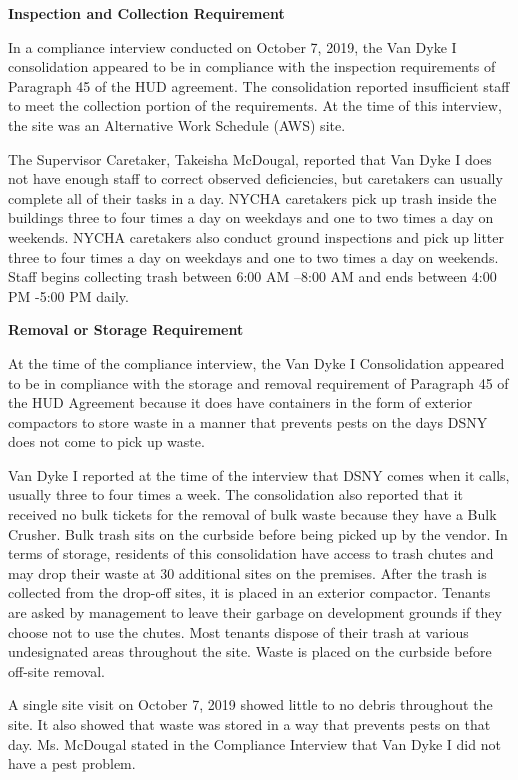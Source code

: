 
\textbf{Inspection and Collection Requirement}

In a compliance interview conducted on October 7, 2019, the Van Dyke I consolidation appeared to be in compliance with the inspection requirements of Paragraph 45 of the HUD agreement. The consolidation reported insufficient staff to meet the collection portion of the requirements. At the time of this interview, the site was an Alternative Work Schedule (AWS) site. 

The Supervisor Caretaker, Takeisha McDougal, reported that Van Dyke I does not have enough staff to correct observed deficiencies, but caretakers can usually complete all of their tasks in a day. NYCHA caretakers pick up trash inside the buildings three to four times a day on weekdays and one to two times a day on weekends. NYCHA caretakers also conduct ground inspections and pick up litter three to four times a day on weekdays and one to two times a day on weekends. Staff begins collecting trash between 6:00 AM --8:00 AM and ends between 4:00 PM -5:00 PM daily. 

\textbf{Removal or Storage Requirement} 

At the time of the compliance interview, the Van Dyke I Consolidation appeared to be in compliance with the storage and removal requirement of Paragraph 45 of the HUD Agreement because it does have containers in the form of exterior compactors to store waste in a manner that prevents pests on the days DSNY does not come to pick up waste. 

Van Dyke I reported at the time of the interview that DSNY comes when it calls, usually three to four times a week. The consolidation also reported that it received no bulk tickets for the removal of bulk waste because they have a Bulk Crusher. Bulk trash sits on the curbside before being picked up by the vendor. In terms of storage, residents of this consolidation have access to trash chutes and may drop their waste at 30 additional sites on the premises. After the trash is collected from the drop-off sites, it is placed in an exterior compactor. Tenants are asked by management to leave their garbage on development grounds if they choose not to use the chutes. Most tenants dispose of their trash at various undesignated areas throughout the site. Waste is placed on the curbside before off-site removal.

A single site visit on October 7, 2019 showed little to no debris throughout the site. It also showed that waste was stored in a way that prevents pests on that day. Ms. McDougal stated in the Compliance Interview that Van Dyke I did not have a pest problem.

